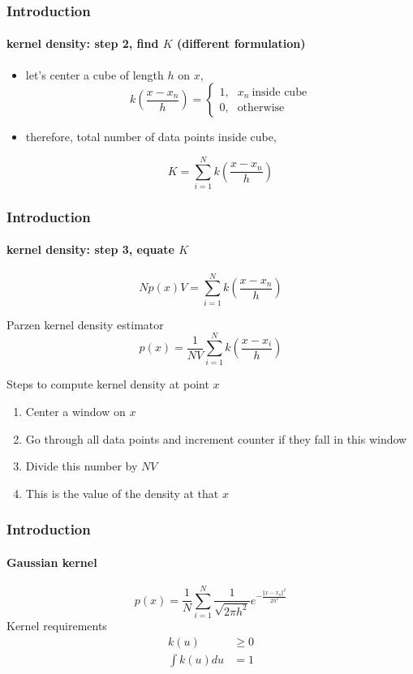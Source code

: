 \begin{frame}
\frametitle{Introduction}
\framesubtitle{kernel density: step 2, find $K$ (different formulation)}
\logoCSIPCPL\mypagenum
	\begin{itemize}
		\item let's center a cube of length $h$ on $x$,
			\begin{equation*}
				k\left(\frac{x-x_n}{h}\right) = 
				\left\{ 
				\begin{array}{rl}
					1\text{,} &  x_n \ \mbox{inside cube}\\ 
					0\text{,} &  \mbox{otherwise}
				\end{array}
				\right.
			\end{equation*}
		\item therefore, total number of data points inside cube,
			\begin{block}{}
				\begin{equation*}
					K = \sum\limits_{i=1}^{N}k\left(\frac{x-x_n}{h}\right)
				\end{equation*}
			\end{block}
	\end{itemize}
\end{frame}


\begin{frame}
\frametitle{Introduction}
\framesubtitle{kernel density: step 3, equate $K$}
\logoCSIPCPL\mypagenum
	\begin{equation*} 
		Np(x)V = \sum\limits_{i=1}^{N}k\left(\frac{x-x_n}{h}\right)
	\end{equation*}
	\begin{block}{Parzen kernel density estimator}
		\begin{equation*}
			p(x) = \frac{1}{NV} \sum\limits_{i=1}^{N}k\left(\frac{x-x_i}{h}\right)
		\end{equation*}
	\end{block}
	Steps to compute kernel density at point $x$
	\begin{enumerate}
		\item Center a window on $x$
		\item Go through all data points and increment counter if they fall in this window
		\item Divide this number by $NV$
		\item This is the value of the density at that $x$
	\end{enumerate}
\end{frame}


\begin{frame}
\frametitle{Introduction}
\framesubtitle{Gaussian kernel}
\logoCSIPCPL\mypagenum
	\begin{equation*}
		p(x) = \frac{1}{N} \sum\limits_{i=1}^{N}\frac{1}{\sqrt{2\pi h^2}}e^{-\frac{\Vert x-x_n\Vert^2}{2 h^2}}
	\end{equation*}
	Kernel requirements
	\begin{align*}
		k(u) &\geq 0 \\
		\int k(u)du &= 1
	\end{align*}
\end{frame}


